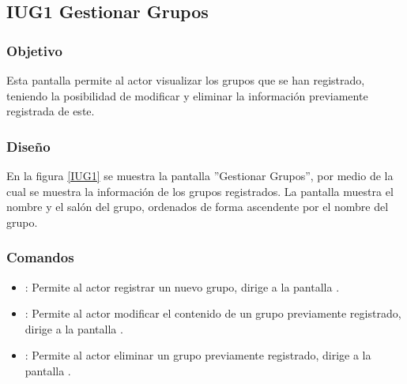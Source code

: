 \subsection{IUG1 Gestionar Grupos}

\subsubsection{Objetivo}
	
	Esta pantalla permite al actor visualizar los grupos que se han registrado, teniendo la posibilidad de modificar y eliminar la información previamente registrada de este.

\subsubsection{Diseño}

    En la figura \ref{IUG1} se muestra la pantalla ''Gestionar Grupos'', por medio de la cual se muestra la información de los grupos registrados. La pantalla muestra el nombre y el salón del grupo, ordenados de forma ascendente por el nombre del grupo.
 

\subsubsection{Comandos}
    \begin{itemize}
		\item \btnRegistrar: Permite al actor registrar un nuevo grupo, dirige a la pantalla .
		
		\item {}: Permite al actor modificar el contenido de un grupo previamente registrado, dirige a la pantalla .
		
		\item {}: Permite al actor eliminar un grupo previamente registrado, dirige a la pantalla .
		
    \end{itemize}
